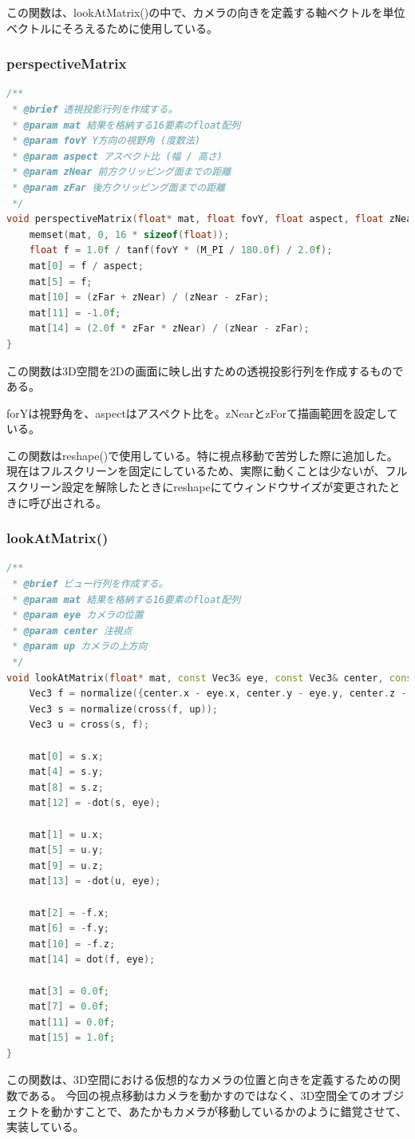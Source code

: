 \documentclass[upIatex,dvipdfmx,a4paper]{jsarticle}
\begin{document}
この関数は、lookAtMatrix()の中で、カメラの向きを定義する軸ベクトルを単位ベクトルにそろえるために使用している。
\subsubsection{perspectiveMatrix}
\begin{lstlisting}[language=C++, caption={perspectiveMatrix() 関数}, label={lst:perspectiveMatrix}]
/**
 * @brief 透視投影行列を作成する。
 * @param mat 結果を格納する16要素のfloat配列
 * @param fovY Y方向の視野角 (度数法)
 * @param aspect アスペクト比 (幅 / 高さ)
 * @param zNear 前方クリッピング面までの距離
 * @param zFar 後方クリッピング面までの距離
 */
void perspectiveMatrix(float* mat, float fovY, float aspect, float zNear, float zFar) {
    memset(mat, 0, 16 * sizeof(float));
    float f = 1.0f / tanf(fovY * (M_PI / 180.0f) / 2.0f);
    mat[0] = f / aspect;
    mat[5] = f;
    mat[10] = (zFar + zNear) / (zNear - zFar);
    mat[11] = -1.0f;
    mat[14] = (2.0f * zFar * zNear) / (zNear - zFar);
}
\end{lstlisting}
この関数は3D空間を2Dの画面に映し出すための透視投影行列を作成するものである。

forYは視野角を、aspectはアスペクト比を。zNearとzForて描画範囲を設定している。

この関数はreshape()で使用している。特に視点移動で苦労した際に追加した。
現在はフルスクリーンを固定にしているため、実際に動くことは少ないが、フルスクリーン設定を解除したときにreshapeにてウィンドウサイズが変更されたときに呼び出される。
\subsubsection{lookAtMatrix()}
\begin{lstlisting}[language=C++, caption={lookAtMatrix() 関数}, label={lst:lookAtMatrix}]
/**
 * @brief ビュー行列を作成する。
 * @param mat 結果を格納する16要素のfloat配列
 * @param eye カメラの位置
 * @param center 注視点
 * @param up カメラの上方向
 */
void lookAtMatrix(float* mat, const Vec3& eye, const Vec3& center, const Vec3& up) {
    Vec3 f = normalize({center.x - eye.x, center.y - eye.y, center.z - eye.z});
    Vec3 s = normalize(cross(f, up));
    Vec3 u = cross(s, f);

    mat[0] = s.x;
    mat[4] = s.y;
    mat[8] = s.z;
    mat[12] = -dot(s, eye);

    mat[1] = u.x;
    mat[5] = u.y;
    mat[9] = u.z;
    mat[13] = -dot(u, eye);

    mat[2] = -f.x;
    mat[6] = -f.y;
    mat[10] = -f.z;
    mat[14] = dot(f, eye);

    mat[3] = 0.0f;
    mat[7] = 0.0f;
    mat[11] = 0.0f;
    mat[15] = 1.0f;
}
\end{lstlisting}
この関数は、3D空間における仮想的なカメラの位置と向きを定義するための関数である。
今回の視点移動はカメラを動かすのではなく、3D空間全てのオブジェクトを動かすことで、あたかもカメラが移動しているかのように錯覚させて、実装している。
\end{document}

